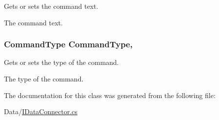 Gets or sets the command text. 

The command text.\hypertarget{classOTA_1_1Data_1_1QueryBuilder_a2e9ad610a470cda1c0a0be926086019c}{}
\subsubsection[{Command\+Type}]{\setlength{\rightskip}{0pt plus 5cm}Command\+Type Command\+Type\hspace{0.3cm}{\ttfamily [get]}, {\ttfamily [set]}}\label{classOTA_1_1Data_1_1QueryBuilder_a2e9ad610a470cda1c0a0be926086019c}


Gets or sets the type of the command. 

The type of the command.

The documentation for this class was generated from the following file\+:\begin{DoxyCompactItemize}
\item 
Data/\hyperlink{IDataConnector_8cs}{I\+Data\+Connector.\+cs}\end{DoxyCompactItemize}
